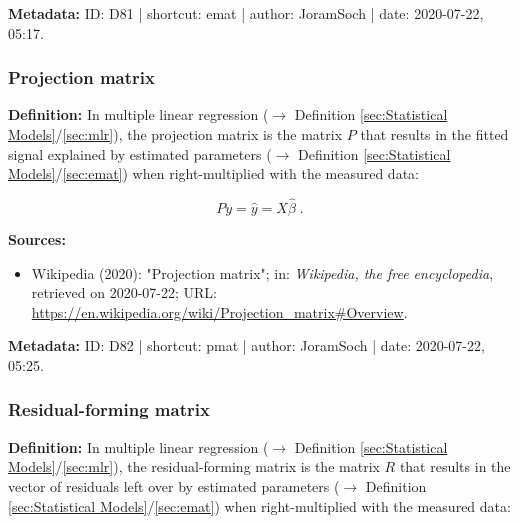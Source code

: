 \documentclass[a4paper,12pt,twoside]{book}
\begin{document}
\vspace{1em}
\textbf{Metadata:} ID: D81 | shortcut: emat | author: JoramSoch | date: 2020-07-22, 05:17.
\vspace{1em}



\subsubsection[\textit{Projection matrix}]{Projection matrix} \label{sec:pmat}
\setcounter{equation}{0}

\textbf{Definition:} In multiple linear regression ($\rightarrow$ Definition \ref{sec:Statistical Models}/\ref{sec:mlr}), the projection matrix is the matrix $P$ that results in the fitted signal explained by estimated parameters ($\rightarrow$ Definition \ref{sec:Statistical Models}/\ref{sec:emat}) when right-multiplied with the measured data:

\begin{equation} \label{eq:pmat-pm}
Py = \hat{y} = X \hat{\beta} \; .
\end{equation}


\vspace{1em}
\textbf{Sources:}
\begin{itemize}
\item Wikipedia (2020): "Projection matrix"; in: \textit{Wikipedia, the free encyclopedia}, retrieved on 2020-07-22; URL: \url{https://en.wikipedia.org/wiki/Projection_matrix#Overview}.
\end{itemize}


\vspace{1em}
\textbf{Metadata:} ID: D82 | shortcut: pmat | author: JoramSoch | date: 2020-07-22, 05:25.
\vspace{1em}



\subsubsection[\textit{Residual-forming matrix}]{Residual-forming matrix} \label{sec:rfmat}
\setcounter{equation}{0}

\textbf{Definition:} In multiple linear regression ($\rightarrow$ Definition \ref{sec:Statistical Models}/\ref{sec:mlr}), the residual-forming matrix is the matrix $R$ that results in the vector of residuals left over by estimated parameters ($\rightarrow$ Definition \ref{sec:Statistical Models}/\ref{sec:emat}) when right-multiplied with the measured data:
\end{document}

